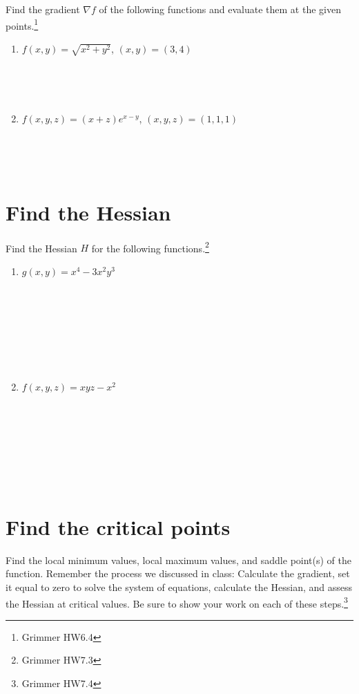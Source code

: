 \documentclass[
]{article}
\begin{document}
Find the gradient \(\nabla f\) of the following functions and evaluate
them at the given points.\footnote{Grimmer HW6.4}

\begin{enumerate}
\def\labelenumi{\alph{enumi}.}
\item
  \(f(x,y) = \sqrt{x^2 + y^2}\), \quad \((x,y) = (3,4)\)

  ~\\
  \strut \\
\item
  \(f(x,y,z) = (x+z)e^{x-y}\), \quad \((x,y,z) = (1,1,1)\)

  ~\\
  \strut \\
\end{enumerate}

\section{Find the Hessian}\label{find-the-hessian}

Find the Hessian \(H\) for the following functions.\footnote{Grimmer
  HW7.3}

\begin{enumerate}
\def\labelenumi{\alph{enumi}.}
\item
  \(g(x,y) = x^4 - 3x^2 y^3\)

  \strut \\
  \strut ~\\
  \strut ~ ~\\
  \strut ~
\item
  \(f(x,y,z) = xyz - x^2\)

  \strut \\
  \strut ~\\
  \strut ~ ~\\
  \strut \\
\end{enumerate}

\section{Find the critical points}\label{find-the-critical-points}

Find the local minimum values, local maximum values, and saddle point(s)
of the function. Remember the process we discussed in class: Calculate
the gradient, set it equal to zero to solve the system of equations,
calculate the Hessian, and assess the Hessian at critical values. Be
sure to show your work on each of these steps.\footnote{Grimmer HW7.4}
\end{document}
